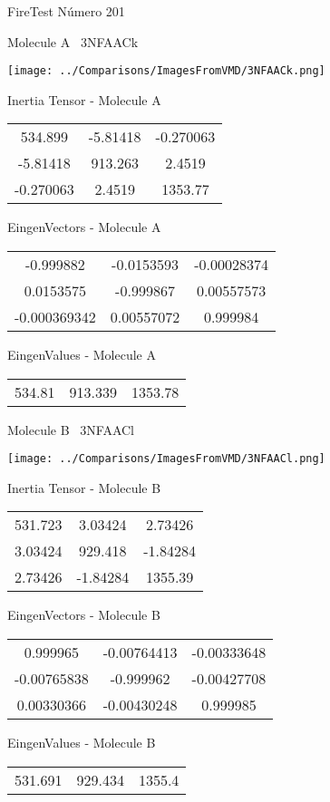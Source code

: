 \vtab[-3cm]
\begin{center}
{\large FireTest \tab Número 201}
\end{center}
\begin{multicols}{2}
\begin{center}

Molecule A \
3NFAACk

\texttt{[image: ../Comparisons/ImagesFromVMD/3NFAACk.png]}

Inertia Tensor - Molecule A \\
\begin{tabular}{|c c c|}
534.899	 & 	-5.81418	 & 	-0.270063	 \\
-5.81418	 & 	913.263	 & 	2.4519	 \\
-0.270063	 & 	2.4519	 & 	1353.77
\end{tabular}

\vtab
 EingenVectors - Molecule A     \\
\begin{tabular}{|c c c|}
-0.999882	 & 	-0.0153593	 & 	-0.00028374	 \\
0.0153575	 & 	-0.999867	 & 	0.00557573	 \\
-0.000369342	 & 	0.00557072	 & 	0.999984
\end{tabular}

\vtab
 EingenValues - Molecule A     \\
\begin{tabular}{|c c c|}
534.81	 & 	913.339	 & 	1353.78	 \\
\end{tabular}
\columnbreak

Molecule B \
3NFAACl

\texttt{[image: ../Comparisons/ImagesFromVMD/3NFAACl.png]}

Inertia Tensor - Molecule B \\
\begin{tabular}{|c c c|}
531.723	 & 	3.03424	 & 	2.73426	 \\
3.03424	 & 	929.418	 & 	-1.84284	 \\
2.73426	 & 	-1.84284	 & 	1355.39
\end{tabular}

\vtab
 EingenVectors - Molecule B     \\
\begin{tabular}{|c c c|}
0.999965	 & 	-0.00764413	 & 	-0.00333648	 \\
-0.00765838	 & 	-0.999962	 & 	-0.00427708	 \\
0.00330366	 & 	-0.00430248	 & 	0.999985
\end{tabular}

\vtab
 EingenValues - Molecule B     \\
\begin{tabular}{|c c c|}
531.691	 & 	929.434	 & 	1355.4	 \\
\end{tabular}

\end{center}
\end{multicols}

